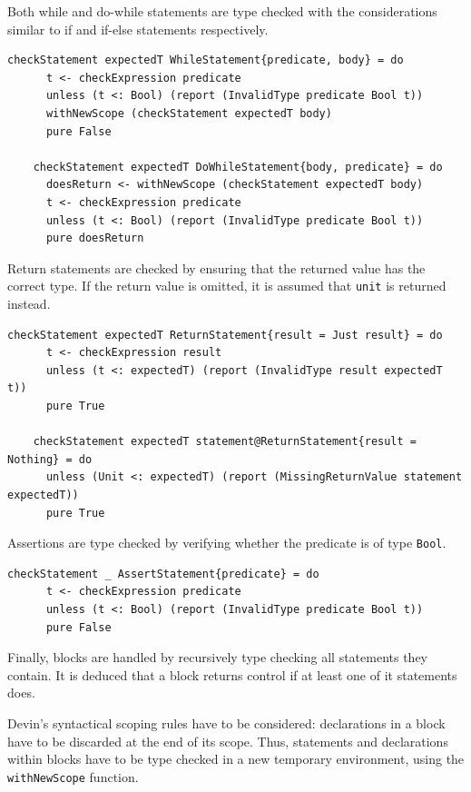 \documentclass[UdineBachThesis,american,11pt]{PhdThesis}
\begin{document}
  Both while and do-while statements are type checked with the considerations
  similar to if and if-else statements respectively.

  \begin{Verbatim}[gobble=4,fontsize=\small]
    checkStatement expectedT WhileStatement{predicate, body} = do
      t <- checkExpression predicate
      unless (t <: Bool) (report (InvalidType predicate Bool t))
      withNewScope (checkStatement expectedT body)
      pure False

    checkStatement expectedT DoWhileStatement{body, predicate} = do
      doesReturn <- withNewScope (checkStatement expectedT body)
      t <- checkExpression predicate
      unless (t <: Bool) (report (InvalidType predicate Bool t))
      pure doesReturn
  \end{Verbatim}

  Return statements are checked by ensuring that the returned value has the
  correct type. If the return value is omitted, it is assumed that
  \mbox{\texttt{unit}} is returned instead.

  \begin{Verbatim}[gobble=4,fontsize=\small]
    checkStatement expectedT ReturnStatement{result = Just result} = do
      t <- checkExpression result
      unless (t <: expectedT) (report (InvalidType result expectedT t))
      pure True

    checkStatement expectedT statement@ReturnStatement{result = Nothing} = do
      unless (Unit <: expectedT) (report (MissingReturnValue statement expectedT))
      pure True
  \end{Verbatim}

  Assertions are type checked by verifying whether the predicate is of type
  \mbox{\texttt{Bool}}.

  \begin{Verbatim}[gobble=4,fontsize=\small]
    checkStatement _ AssertStatement{predicate} = do
      t <- checkExpression predicate
      unless (t <: Bool) (report (InvalidType predicate Bool t))
      pure False
  \end{Verbatim}

  Finally, blocks are handled by recursively type checking all statements they
  contain. It is deduced that a block returns control if at least one of it
  statements does.

  Devin's syntactical scoping rules have to be considered: declarations in a
  block have to be discarded at the end of its scope. Thus, statements and
  declarations within blocks have to be type checked in a new temporary
  environment, using the \mbox{\texttt{withNewScope}} function.
\end{document}
